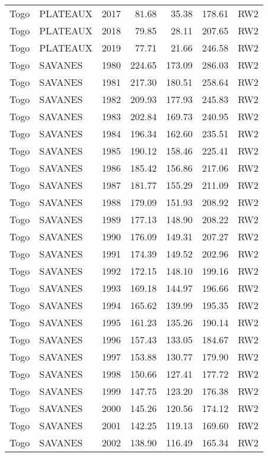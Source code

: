 \begin{longtable}{lllrrrl}
  Togo & PLATEAUX & 2017 & 81.68 & 35.38 & 178.61 & RW2 \\ 
  Togo & PLATEAUX & 2018 & 79.85 & 28.11 & 207.65 & RW2 \\ 
  Togo & PLATEAUX & 2019 & 77.71 & 21.66 & 246.58 & RW2 \\ 
  Togo & SAVANES & 1980 & 224.65 & 173.09 & 286.03 & RW2 \\ 
  Togo & SAVANES & 1981 & 217.30 & 180.51 & 258.64 & RW2 \\ 
  Togo & SAVANES & 1982 & 209.93 & 177.93 & 245.83 & RW2 \\ 
  Togo & SAVANES & 1983 & 202.84 & 169.73 & 240.95 & RW2 \\ 
  Togo & SAVANES & 1984 & 196.34 & 162.60 & 235.51 & RW2 \\ 
  Togo & SAVANES & 1985 & 190.12 & 158.46 & 225.41 & RW2 \\ 
  Togo & SAVANES & 1986 & 185.42 & 156.86 & 217.06 & RW2 \\ 
  Togo & SAVANES & 1987 & 181.77 & 155.29 & 211.09 & RW2 \\ 
  Togo & SAVANES & 1988 & 179.09 & 151.93 & 208.92 & RW2 \\ 
  Togo & SAVANES & 1989 & 177.13 & 148.90 & 208.22 & RW2 \\ 
  Togo & SAVANES & 1990 & 176.09 & 149.31 & 207.27 & RW2 \\ 
  Togo & SAVANES & 1991 & 174.39 & 149.52 & 202.96 & RW2 \\ 
  Togo & SAVANES & 1992 & 172.15 & 148.10 & 199.16 & RW2 \\ 
  Togo & SAVANES & 1993 & 169.18 & 144.97 & 196.66 & RW2 \\ 
  Togo & SAVANES & 1994 & 165.62 & 139.99 & 195.35 & RW2 \\ 
  Togo & SAVANES & 1995 & 161.23 & 135.26 & 190.14 & RW2 \\ 
  Togo & SAVANES & 1996 & 157.43 & 133.05 & 184.67 & RW2 \\ 
  Togo & SAVANES & 1997 & 153.88 & 130.77 & 179.90 & RW2 \\ 
  Togo & SAVANES & 1998 & 150.66 & 127.41 & 177.72 & RW2 \\ 
  Togo & SAVANES & 1999 & 147.75 & 123.20 & 176.38 & RW2 \\ 
  Togo & SAVANES & 2000 & 145.26 & 120.56 & 174.12 & RW2 \\ 
  Togo & SAVANES & 2001 & 142.25 & 119.13 & 169.60 & RW2 \\ 
  Togo & SAVANES & 2002 & 138.90 & 116.49 & 165.34 & RW2 \\ 

\end{longtable}
